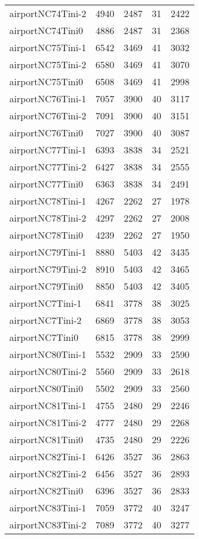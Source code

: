 \begin{longtable}{lrrrr}
airportNC74Tini-2 & 4940 & 2487 & 31 & 2422 \\
airportNC74Tini0 & 4886 & 2487 & 31 & 2368 \\
airportNC75Tini-1 & 6542 & 3469 & 41 & 3032 \\
airportNC75Tini-2 & 6580 & 3469 & 41 & 3070 \\
airportNC75Tini0 & 6508 & 3469 & 41 & 2998 \\
airportNC76Tini-1 & 7057 & 3900 & 40 & 3117 \\
airportNC76Tini-2 & 7091 & 3900 & 40 & 3151 \\
airportNC76Tini0 & 7027 & 3900 & 40 & 3087 \\
airportNC77Tini-1 & 6393 & 3838 & 34 & 2521 \\
airportNC77Tini-2 & 6427 & 3838 & 34 & 2555 \\
airportNC77Tini0 & 6363 & 3838 & 34 & 2491 \\
airportNC78Tini-1 & 4267 & 2262 & 27 & 1978 \\
airportNC78Tini-2 & 4297 & 2262 & 27 & 2008 \\
airportNC78Tini0 & 4239 & 2262 & 27 & 1950 \\
airportNC79Tini-1 & 8880 & 5403 & 42 & 3435 \\
airportNC79Tini-2 & 8910 & 5403 & 42 & 3465 \\
airportNC79Tini0 & 8850 & 5403 & 42 & 3405 \\
airportNC7Tini-1 & 6841 & 3778 & 38 & 3025 \\
airportNC7Tini-2 & 6869 & 3778 & 38 & 3053 \\
airportNC7Tini0 & 6815 & 3778 & 38 & 2999 \\
airportNC80Tini-1 & 5532 & 2909 & 33 & 2590 \\
airportNC80Tini-2 & 5560 & 2909 & 33 & 2618 \\
airportNC80Tini0 & 5502 & 2909 & 33 & 2560 \\
airportNC81Tini-1 & 4755 & 2480 & 29 & 2246 \\
airportNC81Tini-2 & 4777 & 2480 & 29 & 2268 \\
airportNC81Tini0 & 4735 & 2480 & 29 & 2226 \\
airportNC82Tini-1 & 6426 & 3527 & 36 & 2863 \\
airportNC82Tini-2 & 6456 & 3527 & 36 & 2893 \\
airportNC82Tini0 & 6396 & 3527 & 36 & 2833 \\
airportNC83Tini-1 & 7059 & 3772 & 40 & 3247 \\
airportNC83Tini-2 & 7089 & 3772 & 40 & 3277 \\

\end{longtable}
